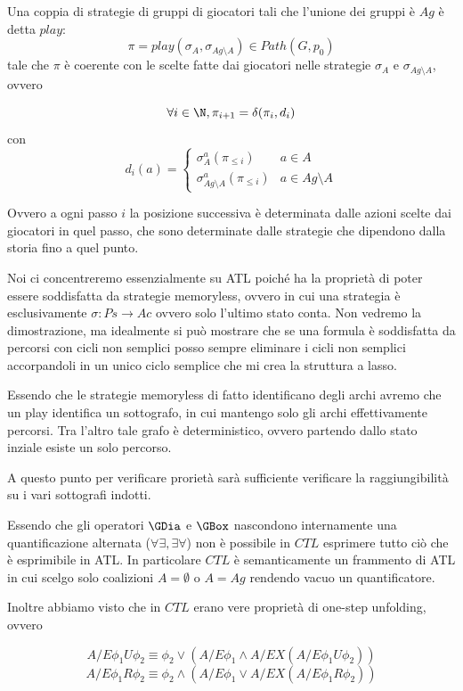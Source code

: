 Una coppia di strategie di gruppi di giocatori tali che l'unione dei gruppi è \(Ag\) è detta \(play\):
\[\pi = play(\sigma_A,\sigma_{Ag\setminus A}) \in Path(G,p_0)\]
tale che \(\pi\) è coerente con le scelte fatte dai giocatori nelle strategie \(\sigma_A\) e \(\sigma_{Ag\setminus A}\), ovvero

\[\forall i \in \N, \pi_{i+1} = \delta(\pi_i, d_i)\]
con
\[d_i(a) = \begin{cases}
  \sigma_A^a(\pi_{\leq i}) & a \in A \\
  \sigma_{Ag\setminus A}^a(\pi_{\leq i}) & a \in Ag\setminus A
\end{cases}\]

Ovvero a ogni passo \(i\) la posizione successiva è determinata dalle azioni scelte dai giocatori in quel passo, che sono determinate dalle strategie che dipendono dalla storia fino a quel punto.

Noi ci concentreremo essenzialmente su ATL poiché ha la proprietà di poter essere soddisfatta da strategie memoryless, ovvero in cui una strategia è esclusivamente \(\sigma: Ps\to Ac\) ovvero solo l'ultimo stato conta. Non vedremo la dimostrazione, ma idealmente si può mostrare che se una formula è soddisfatta da percorsi con cicli non semplici posso sempre eliminare i cicli non semplici accorpandoli in un unico ciclo semplice che mi crea la struttura a lasso.

Essendo che le strategie memoryless di fatto identificano degli archi avremo che un play identifica un sottografo, in cui mantengo solo gli archi effettivamente percorsi. Tra l'altro tale grafo è deterministico, ovvero partendo dallo stato inziale esiste un solo percorso.

A questo punto per verificare prorietà sarà sufficiente verificare la raggiungibilità su i vari sottografi indotti.

Essendo che gli operatori \(\GDia\) e \(\GBox\) nascondono internamente una quantificazione alternata (\(\forall\exists, \exists\forall\)) non è possibile in \(CTL\) esprimere tutto ciò che è esprimibile in ATL. In particolare \(CTL\) è semanticamente un frammento di ATL in cui scelgo solo coalizioni \(A=\emptyset\) o \(A = Ag\) rendendo vacuo un quantificatore.

Inoltre abbiamo visto che in \(CTL\) erano vere proprietà di one-step unfolding, ovvero

\[A/E \phi_1 U \phi_2 \equiv \phi_2 \lor (A/E \phi_1 \land A/E X(A/E \phi_1 U \phi_2))\]
\[A/E \phi_1 R \phi_2 \equiv \phi_2 \land (A/E \phi_1 \lor A/E X(A/E \phi_1 R \phi_2))\]

